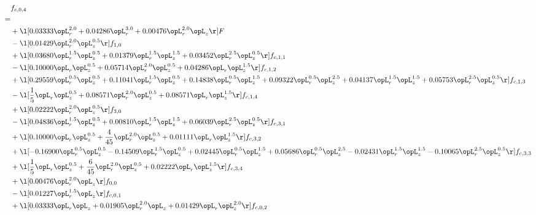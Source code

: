 \begin{alignat}{2} 
\label{eq:f_04_1} 
& f_{c,0,4} \nonumber \\ 
 = \\ 
& + \l[  0.03333 \opL_r^{2.0} +  0.04286 \opL_r^{3.0} +  0.00476 \opL_r^{2.0} \opL_z  \r] F \nonumber \\ 
& - \l[  0.01429 \opL_r^{2.0} \opL_z^{0.5}  \r] f_{1,0} \nonumber \\ 
& + \l[  0.03680 \opL_r^{1.5} \opL_z^{0.5} +  0.01379 \opL_r^{1.5} \opL_z^{1.5} +  0.03452 \opL_r^{2.5} \opL_z^{0.5}  \r] f_{c,1,1} \nonumber \\ 
& - \l[  0.10000 \opL_r \opL_z^{0.5} +  0.05714 \opL_r^{2.0} \opL_z^{0.5} +  0.04286 \opL_r \opL_z^{1.5}  \r] f_{c,1,2} \nonumber \\ 
& + \l[  0.29559 \opL_r^{0.5} \opL_z^{0.5} +  0.11041 \opL_r^{1.5} \opL_z^{0.5} +  0.14838 \opL_r^{0.5} \opL_z^{1.5} +  0.09322 \opL_r^{0.5} \opL_z^{2.5} +  0.04137 \opL_r^{1.5} \opL_z^{1.5} +  0.05753 \opL_r^{2.5} \opL_z^{0.5}  \r] f_{c,1,3} \nonumber \\ 
& - \l[ \frac{1}{5} \opL_r \opL_z^{0.5} +  0.08571 \opL_r^{2.0} \opL_z^{0.5} +  0.08571 \opL_r \opL_z^{1.5}  \r] f_{c,1,4} \nonumber \\ 
& + \l[  0.02222 \opL_r^{2.0} \opL_z^{0.5}  \r] f_{3,0} \nonumber \\ 
& - \l[  0.04836 \opL_r^{1.5} \opL_z^{0.5} +  0.00810 \opL_r^{1.5} \opL_z^{1.5} +  0.06039 \opL_r^{2.5} \opL_z^{0.5}  \r] f_{c,3,1} \nonumber \\ 
& + \l[  0.10000 \opL_r \opL_z^{0.5} + \frac{4}{45} \opL_r^{2.0} \opL_z^{0.5} +  0.01111 \opL_r \opL_z^{1.5}  \r] f_{c,3,2} \nonumber \\ 
& + \l[  -0.16900 \opL_r^{0.5} \opL_z^{0.5}   -0.14509 \opL_r^{1.5} \opL_z^{0.5} +  0.02445 \opL_r^{0.5} \opL_z^{1.5} +  0.05686 \opL_r^{0.5} \opL_z^{2.5}   -0.02431 \opL_r^{1.5} \opL_z^{1.5}   -0.10065 \opL_r^{2.5} \opL_z^{0.5}  \r] f_{c,3,3} \nonumber \\ 
& + \l[ \frac{1}{5} \opL_r \opL_z^{0.5} + \frac{6}{45} \opL_r^{2.0} \opL_z^{0.5} +  0.02222 \opL_r \opL_z^{1.5}  \r] f_{c,3,4} \nonumber \\ 
& + \l[  0.00476 \opL_r^{2.0} \opL_z  \r] f_{0,0} \nonumber \\ 
& - \l[  0.01227 \opL_r^{1.5} \opL_z  \r] f_{c,0,1} \nonumber \\ 
& + \l[  0.03333 \opL_r \opL_z +  0.01905 \opL_r^{2.0} \opL_z +  0.01429 \opL_r \opL_z^{2.0}  \r] f_{c,0,2} \nonumber \\ 

\end{alignat}
